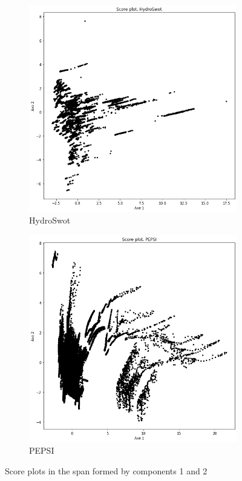 \begin{figure}[H]
    \centering
    \begin{subfigure}{0.45\textwidth}
        \centering
        \includegraphics[scale=0.28]{Graph/scoreplot_hydro.png}
        \caption{HydroSwot}
        \label{subfig:sph}
    \end{subfigure}
    \begin{subfigure}{0.45\textwidth}
        \centering
        \includegraphics[scale=0.28]{Graph/scoreplot_pepsi.png}
        \caption{PEPSI}
        \label{subfig:spp}
    \end{subfigure}
\caption{Score plots in the span formed by components 1 and 2}
\label{fig:scoreplot}
\end{figure}

